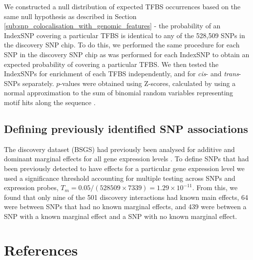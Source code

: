 \documentclass{article}
\begin{document}
We constructed a null distribution of expected TFBS occurrences based on the same null hypothesis as described in Section \ref{sub:snp_colocalisation_with_genomic_features} - the probability of an IndexSNP covering a particular TFBS is identical to any of the 528,509 SNPs in the discovery SNP chip. To do this, we performed the same procedure for each SNP in the discovery SNP chip as was performed for each IndexSNP to obtain an expected probability of covering a particular TFBS. We then tested the IndexSNPs for enrichment of each TFBS independently, and for \emph{cis}- and \emph{trans}-SNPs separately. $p$-values were obtained using Z-scores, calculated by using a normal approximation to the sum of binomial random variables representing motif hits along the sequence \cite{HoSui2005}.


\subsection{Defining previously identified SNP associations}

The discovery dataset (BSGS) had previously been analysed for additive and dominant marginal effects for all gene expression levels \cite{Powell2012, Powell2013}. To define SNPs that had been previously detected to have effects for a particular gene expression level we used a significance threshold accounting for multiple testing across SNPs and expression probes, $T_{m} = 0.05 / (528509 \times 7339) = 1.29 \times 10^{-11}$. From this, we found that only nine of the 501 discovery interactions had known main effects, 64 were between SNPs that had no known marginal effects, and 439 were between a SNP with a known marginal effect and a SNP with no known marginal effect.



\section{References}

\end{document}
